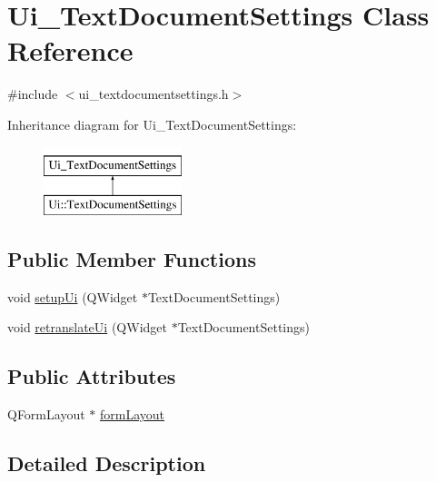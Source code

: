 \hypertarget{classUi__TextDocumentSettings}{\section{Ui\+\_\+\+Text\+Document\+Settings Class Reference}
\label{classUi__TextDocumentSettings}
}


{\ttfamily \#include $<$ui\+\_\+textdocumentsettings.\+h$>$}

Inheritance diagram for Ui\+\_\+\+Text\+Document\+Settings\+:\begin{figure}[H]
\begin{center}
\leavevmode
\includegraphics[height=2.000000cm]{classUi__TextDocumentSettings}
\end{center}
\end{figure}
\subsection*{Public Member Functions}
\begin{DoxyCompactItemize}
\item 
void \hyperlink{classUi__TextDocumentSettings_ae1e9882252763b43677c0cd18bfc7af0}{setup\+Ui} (Q\+Widget $\ast$Text\+Document\+Settings)
\item 
void \hyperlink{classUi__TextDocumentSettings_acf35bf0138554f6578f2a878077348e0}{retranslate\+Ui} (Q\+Widget $\ast$Text\+Document\+Settings)
\end{DoxyCompactItemize}
\subsection*{Public Attributes}
\begin{DoxyCompactItemize}
\item 
Q\+Form\+Layout $\ast$ \hyperlink{classUi__TextDocumentSettings_a1e46e2a4fcdca2d5ea087a09e12aea10}{form\+Layout}
\end{DoxyCompactItemize}


\subsection{Detailed Description}


